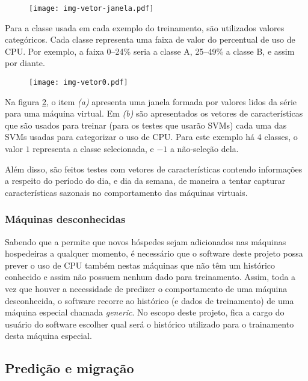 \begin{figure}[htp]
\centering
\texttt{[image: img-vetor-janela.pdf]}
\label{fig:vetorjanela}
\end{figure}

Para a classe usada em cada exemplo do treinamento, são utilizados
valores categóricos. Cada classe representa uma faixa de valor do
percentual de uso de CPU. Por exemplo, a faixa 0--24\% seria a classe
A, 25--49\% a classe B, e assim por diante.

\begin{figure}[htp]
\centering
\texttt{[image: img-vetor0.pdf]}
\label{fig:vetor0}
\end{figure}

Na figura \ref{fig:vetor0}, o item \emph{(a)} apresenta uma janela
formada por valores lidos da série para uma máquina virtual. Em \emph{(b)}
são apresentados os vetores de características que são usados para treinar
(para os testes que usarão SVMs) cada uma das SVMs usadas para categorizar
o uso de CPU. Para este exemplo há 4 classes, o valor $1$ representa a
classe selecionada, e $-1$ a não-seleção dela.

Além disso, são feitos testes com vetores de características contendo
informações a respeito do período do dia, e dia da semana, de maneira a
tentar capturar características sazonais no comportamento das máquinas
virtuais.

\subsubsection{Máquinas desconhecidas}\label{sec:maquinasdesconhecidas}

Sabendo que a \libvirt{} permite que novos hóspedes sejam adicionados nas
máquinas hospedeiras a qualquer momento, é necessário que o software deste
projeto possa prever o uso de CPU também nestas máquinas que não têm um
histórico conhecido e assim não possuem nenhum dado para treinamento.
Assim, toda a vez que houver a necessidade de predizer o comportamento de
uma máquina desconhecida, o software recorre ao histórico (e dados de
treinamento) de uma máquina especial chamada \emph{generic}. No escopo deste
projeto, fica a cargo do usuário do software escolher qual será o histórico
utilizado para o trainamento desta máquina especial.

\subsection{Predição e migração}

